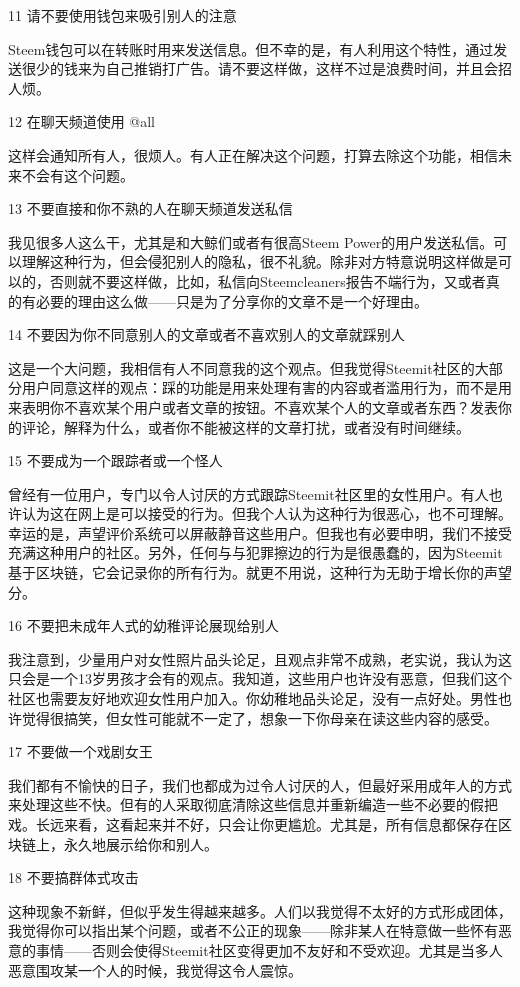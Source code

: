 \documentclass[]{ctexbook}
\begin{document}
11 请不要使用钱包来吸引别人的注意

Steem钱包可以在转账时用来发送信息。但不幸的是，有人利用这个特性，通过发送很少的钱来为自己推销打广告。请不要这样做，这样不过是浪费时间，并且会招人烦。

12 在聊天频道使用 @all

这样会通知所有人，很烦人。有人正在解决这个问题，打算去除这个功能，相信未来不会有这个问题。

13 不要直接和你不熟的人在聊天频道发送私信

我见很多人这么干，尤其是和大鲸们或者有很高Steem Power的用户发送私信。可以理解这种行为，但会侵犯别人的隐私，很不礼貌。除非对方特意说明这样做是可以的，否则就不要这样做，比如，私信向Steemcleaners报告不端行为，又或者真的有必要的理由这么做------只是为了分享你的文章不是一个好理由。

14 不要因为你不同意别人的文章或者不喜欢别人的文章就踩别人

这是一个大问题，我相信有人不同意我的这个观点。但我觉得Steemit社区的大部分用户同意这样的观点：踩的功能是用来处理有害的内容或者滥用行为，而不是用来表明你不喜欢某个用户或者文章的按钮。不喜欢某个人的文章或者东西？发表你的评论，解释为什么，或者你不能被这样的文章打扰，或者没有时间继续。

15 不要成为一个跟踪者或一个怪人

曾经有一位用户，专门以令人讨厌的方式跟踪Steemit社区里的女性用户。有人也许认为这在网上是可以接受的行为。但我个人认为这种行为很恶心，也不可理解。幸运的是，声望评价系统可以屏蔽静音这些用户。但我也有必要申明，我们不接受充满这种用户的社区。另外，任何与与犯罪擦边的行为是很愚蠢的，因为Steemit基于区块链，它会记录你的所有行为。就更不用说，这种行为无助于增长你的声望分。

16 不要把未成年人式的幼稚评论展现给别人

我注意到，少量用户对女性照片品头论足，且观点非常不成熟，老实说，我认为这只会是一个13岁男孩才会有的观点。我知道，这些用户也许没有恶意，但我们这个社区也需要友好地欢迎女性用户加入。你幼稚地品头论足，没有一点好处。男性也许觉得很搞笑，但女性可能就不一定了，想象一下你母亲在读这些内容的感受。

17 不要做一个戏剧女王

我们都有不愉快的日子，我们也都成为过令人讨厌的人，但最好采用成年人的方式来处理这些不快。但有的人采取彻底清除这些信息并重新编造一些不必要的假把戏。长远来看，这看起来并不好，只会让你更尴尬。尤其是，所有信息都保存在区块链上，永久地展示给你和别人。

18 不要搞群体式攻击

这种现象不新鲜，但似乎发生得越来越多。人们以我觉得不太好的方式形成团体，我觉得你可以指出某个问题，或者不公正的现象------除非某人在特意做一些怀有恶意的事情------否则会使得Steemit社区变得更加不友好和不受欢迎。尤其是当多人恶意围攻某一个人的时候，我觉得这令人震惊。
\end{document}
